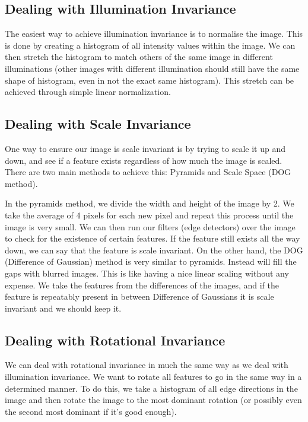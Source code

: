 \documentclass{article}
\begin{document}
	\subsection{Dealing with Illumination Invariance}
	The easiest way to achieve illumination invariance is to normalise the image. This is done by creating a histogram of all intensity values within the image. We can then stretch the histogram to match others of the same image in different illuminations (other images with different illumination should still have the same shape of histogram, even in not the exact same histogram). This stretch can be achieved through simple linear normalization.
	
	\subsection{Dealing with Scale Invariance}
	 One way to ensure our image is scale invariant is by trying to scale it up and down, and see if a feature exists regardless of how much the image is scaled. There are two main methods to achieve this: Pyramids and Scale Space (DOG method). 
	
	\par	 
	 In the pyramids method, we divide the width and height of the image by 2. We take the average of 4 pixels for each new pixel and repeat this process until the image is very small. We can then run our filters (edge detectors) over the image to check for the existence of certain features. If the feature still exists all the way down, we can say that the feature is scale invariant. On the other hand, the DOG (Difference of Gaussian) method is very similar to pyramids. Instead will fill the gaps with blurred images. This is like having a nice linear scaling without any expense. We take the features from the differences of the images, and if the feature is repeatably present in between Difference of Gaussians it is scale invariant and we should keep it.
	
	\subsection{Dealing with Rotational Invariance}
		We can deal with rotational invariance in much the same way as we deal with illumination invariance. We want to rotate all features to go in the same way in a determined manner. To do this, we take a histogram of all edge directions in the image and then rotate the image to the most dominant rotation (or possibly even the second most dominant if it's good enough).
		
\end{document}
